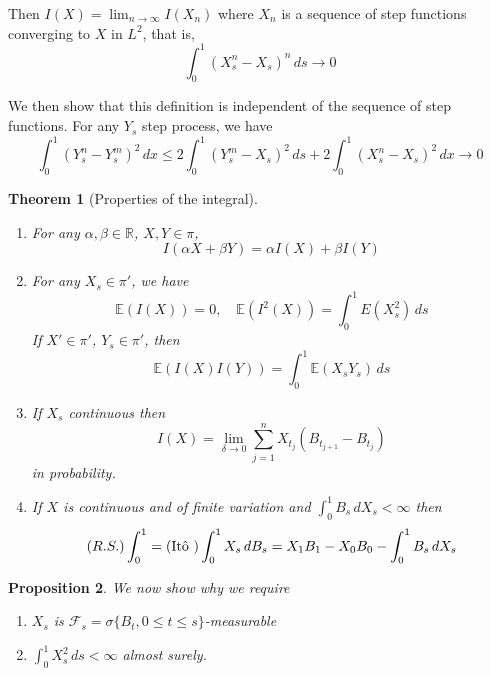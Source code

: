 \documentclass[10pt, oneside, reqno]{amsart}
\theoremstyle{plain}%
\newtheorem{thm}{Theorem}[section]
\newtheorem{prop}[thm]{Proposition}
\theoremstyle{definition}
\theoremstyle{remark}
\newcommand{\R}{\mathbb{R}}
\newcommand{\E}{\mathbb{E}}
\newcommand{\sigf}{\mathcal{F}}
\begin{document}
Then $I(X) = \lim_{n \rightarrow \infty} I(X_n)$ where $X_n$ is a sequence of step functions converging to $X$ in $L^2$, that is, \[
    \int_0^1 (X_s^n - X_s)^n \, ds \rightarrow 0
\]

We then show that this definition is independent of the sequence of step functions.  For any $Y_s$ step process, we have \[
    \int_0^1 (Y_s^n - Y_s^m)^2 \, dx \leq 2\int_0^1 (Y_s^m - X_s)^2 \, ds + 2 \int_0^1 (X_s^n - X_s)^2 \, dx \rightarrow 0
\] 

\begin{thm}[Properties of the \ito integral]{\ }
    \begin{enumerate}
        \item For any $\alpha, \beta \in \R$, $X, Y \in \pi$, \[
            I(\alpha X + \beta Y) = \alpha I(X) + \beta I(Y)
        \]
        \item For any $X_s \in \pi'$, we have \[
            \E(I(X)) = 0, \quad \E(I^2(X)) = \int_0^1 E(X_s^2) \, ds
        \]  If $X' \in \pi'$, $Y_s \in \pi'$, then \[
            \E(I(X) I(Y) ) = \int_0^1 \E(X_s Y_s) \, ds
        \]
        \item If $X_s$ continuous then \[
            I(X) = \lim_{\delta \rightarrow 0} \sum_{j=1}^n X_{t_j} (B_{t_{j+1}} - B_{t_j})
        \] in probability.
        \item If $X$ is continuous and of finite variation and $\int_0^1 B_s \, dX_s < \infty$ then \[
            (R.S.) \int_0^1 = (\text{It\^o\ }) \int_0^1 X_s \, dB_s = X_1 B_1 - X_0 B_0 - \int_0^1 B_s \, dX_s
        \]
    \end{enumerate}
\end{thm}
\begin{prop}
    We now show why we require
    \begin{enumerate}
        \item $X_s$ is $\sigf_s = \sigma \{ B_t, 0 \leq t \leq s \}$-measurable
        \item $\int_0^1 X_s^2 \, ds < \infty$ almost surely.  
    \end{enumerate}
\end{prop}
\end{document}
